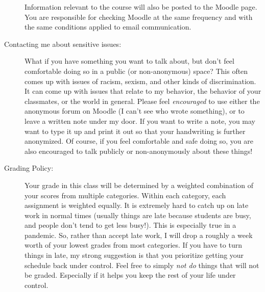 \documentclass[12pt]{article}
\begin{document}
\begin{description}
  Information relevant to the course will also be posted to the Moodle page. You are responsible for checking Moodle at the same frequency and with the same conditions applied to email communication.

\item[Contacting me about sensitive issues:] What if you have something you want to talk about, but don't feel comfortable doing so in a public (or non-anonymous) space? This often comes up with issues of racism, sexism, and other kinds of discrimination. It can come up with issues that relate to my behavior, the behavior of your classmates, or the world in general. Please feel {\it encouraged} to use either the anonymous forum on Moodle (I can't see who wrote something), or to leave a written note under my door. If you want to write a note, you may want to type it up and print it out so that your handwriting is further anonymized. Of course, if you feel comfortable and safe doing so, you are also encouraged to talk publicly or non-anonymously about these things!

\item[Grading Policy:]
  Your grade in this class will be determined by a weighted combination of your scores from multiple categories. Within each category, each assignment is weighted equally. It is extremely hard to catch up on late work in normal times (usually things are late because students are busy, and people don't tend to get less busy!). This is especially true in a pandemic. So, rather than accept late work, I will drop a roughly a week worth of your lowest grades from most categories. If you have to turn things in late, my strong suggestion is that you prioritize getting your schedule back under control. Feel free to simply \textit{not do} things that will not be graded. Especially if it helps you keep the rest of your life under control.



\end{description}
\end{document}
